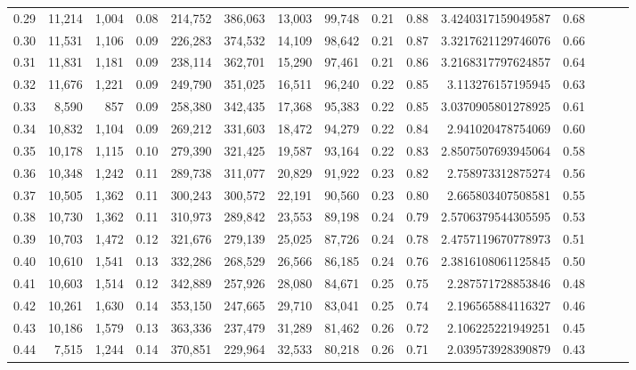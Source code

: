 \begin{tabular}{rrrrrrrrrrrrrrr}
0.29 &  11,214 &  1,004 &  0.08 &  214,752 &  386,063 &   13,003 &   99,748 &  0.21 &  0.88 &    3.4240317159049587 &      0.68 \\
0.30 &  11,531 &  1,106 &  0.09 &  226,283 &  374,532 &   14,109 &   98,642 &  0.21 &  0.87 &    3.3217621129746076 &      0.66 \\
0.31 &  11,831 &  1,181 &  0.09 &  238,114 &  362,701 &   15,290 &   97,461 &  0.21 &  0.86 &    3.2168317797624857 &      0.64 \\
0.32 &  11,676 &  1,221 &  0.09 &  249,790 &  351,025 &   16,511 &   96,240 &  0.22 &  0.85 &     3.113276157195945 &      0.63 \\
0.33 &   8,590 &    857 &  0.09 &  258,380 &  342,435 &   17,368 &   95,383 &  0.22 &  0.85 &    3.0370905801278925 &      0.61 \\
0.34 &  10,832 &  1,104 &  0.09 &  269,212 &  331,603 &   18,472 &   94,279 &  0.22 &  0.84 &     2.941020478754069 &      0.60 \\
0.35 &  10,178 &  1,115 &  0.10 &  279,390 &  321,425 &   19,587 &   93,164 &  0.22 &  0.83 &    2.8507507693945064 &      0.58 \\
0.36 &  10,348 &  1,242 &  0.11 &  289,738 &  311,077 &   20,829 &   91,922 &  0.23 &  0.82 &     2.758973312875274 &      0.56 \\
0.37 &  10,505 &  1,362 &  0.11 &  300,243 &  300,572 &   22,191 &   90,560 &  0.23 &  0.80 &     2.665803407508581 &      0.55 \\
0.38 &  10,730 &  1,362 &  0.11 &  310,973 &  289,842 &   23,553 &   89,198 &  0.24 &  0.79 &    2.5706379544305595 &      0.53 \\
0.39 &  10,703 &  1,472 &  0.12 &  321,676 &  279,139 &   25,025 &   87,726 &  0.24 &  0.78 &    2.4757119670778973 &      0.51 \\
0.40 &  10,610 &  1,541 &  0.13 &  332,286 &  268,529 &   26,566 &   86,185 &  0.24 &  0.76 &    2.3816108061125845 &      0.50 \\
0.41 &  10,603 &  1,514 &  0.12 &  342,889 &  257,926 &   28,080 &   84,671 &  0.25 &  0.75 &     2.287571728853846 &      0.48 \\
0.42 &  10,261 &  1,630 &  0.14 &  353,150 &  247,665 &   29,710 &   83,041 &  0.25 &  0.74 &     2.196565884116327 &      0.46 \\
0.43 &  10,186 &  1,579 &  0.13 &  363,336 &  237,479 &   31,289 &   81,462 &  0.26 &  0.72 &     2.106225221949251 &      0.45 \\
0.44 &   7,515 &  1,244 &  0.14 &  370,851 &  229,964 &   32,533 &   80,218 &  0.26 &  0.71 &     2.039573928390879 &      0.43 \\

\end{tabular}
